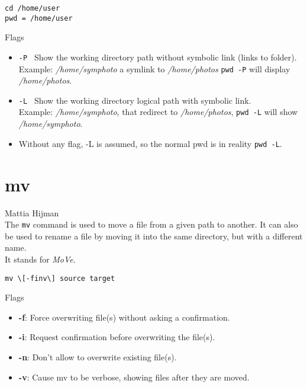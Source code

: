 \documentclass[hidelinks,12pt,a4paper,numbers=enddot]{scrartcl}
\begin{document}
\begin{verbatim}
cd /home/user
pwd = /home/user
\end{verbatim}

Flags

\begin{itemize}
    \item \texttt{-P } Show the  working directory path without symbolic link (links to
        folder).\\
        Example: \emph{/home/symphoto} a symlink to \emph{/home/photos} \texttt{pwd -P}
        will display \emph{/home/photos}.
    
    \item \texttt{-L } Show the working directory logical path with symbolic link.\\
        Example: \emph{/home/symphoto}, that redirect to \emph{/home/photos},
        \texttt{pwd -L} will show \emph{/home/symphoto}.
    
    \item Without any flag, -L is assumed, so the normal pwd is in reality \texttt{pwd -L}.
\end{itemize}

\section{mv}


\large Mattia Hijman \normalsize\\





The \texttt{mv} command is used to move a file from a given path to another.
It can also be used to rename a file by moving it into the same directory,
but with a different name.\\
It stands for \emph{MoVe}.

\begin{verbatim}
mv \[-finv\] source target
\end{verbatim}

Flags

\begin{itemize}
    \item  \textbf{-f}: Force overwriting  file(s) without asking a confirmation.
    \item  \textbf{-i}: Request confirmation before overwriting the file(s).
    \item  \textbf{-n}: Don't allow to overwrite existing file(s).
    \item  \textbf{-v}: Cause mv to be verbose, showing files after they are moved.
\end{itemize}
\end{document}
